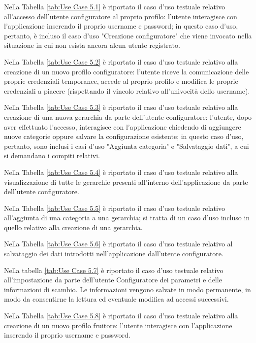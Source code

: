 Nella Tabella \ref{tab:Use Case 5.1} è riportato il caso d'uso testuale relativo all'accesso dell'utente configuratore al proprio profilo: l'utente interagisce con l'applicazione inserendo il proprio username e password; in questo caso d'uso, pertanto, è incluso il caso d'uso "Creazione configuratore" che viene invocato nella situazione in cui non esista ancora alcun utente registrato.\bigskip

Nella Tabella \ref{tab:Use Case 5.2} è riportato il caso d'uso testuale relativo alla creazione di un nuovo profilo configuratore: l'utente riceve la comunicazione delle proprie credenziali temporanee, accede al proprio profilo e modifica le proprie credenziali a piacere (rispettando il vincolo relativo all'univocità dello username).\bigskip

Nella Tabella \ref{tab:Use Case 5.3} è riportato il caso d'uso testuale relativo alla creazione di una nuova gerarchia da parte dell'utente configuratore: l'utente, dopo aver effettuato l'accesso, interagisce con l'applicazione chiedendo di aggiungere nuove categorie oppure salvare la configurazione esistente; in questo caso d'uso, pertanto, sono inclusi i casi d'uso "Aggiunta categoria" e "Salvataggio dati", a cui si demandano i compiti relativi.\bigskip

Nella Tabella \ref{tab:Use Case 5.4} è riportato il caso d'uso testuale relativo alla visualizzazione di tutte le gerarchie presenti all'interno dell'applicazione da parte dell'utente configuratore.\bigskip

Nella Tabella \ref{tab:Use Case 5.5} è riportato il caso d'uso testuale relativo all'aggiunta di una categoria a una gerarchia; si tratta di un caso d'uso incluso in quello relativo alla creazione di una gerarchia.\bigskip

Nella Tabella \ref{tab:Use Case 5.6} è riportato il caso d'uso testuale relativo al salvataggio dei dati introdotti nell'applicazione dall'utente configuratore.\bigskip

Nella tabella \ref{tab:Use Case 5.7} è riportato il caso d'uso testuale relativo all'impostazione da parte dell'utente Configuratore dei parametri e delle informazioni di scambio. Le informazioni vengono salvate in modo permanente, in modo da consentirne la lettura ed eventuale modifica ad accessi successivi.\bigskip

Nella Tabella \ref{tab:Use Case 5.8} è riportato il caso d'uso testuale relativo alla creazione di un nuovo profilo fruitore: l'utente interagisce con l'applicazione inserendo il proprio username e password.\bigskip

